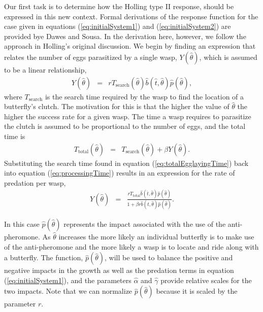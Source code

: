 \documentclass[12pt]{article}
\newcommand{\origB}{\hat{b}}
\newcommand{\origAlpha}{\hat{\alpha}}
\newcommand{\origGamma}{\hat{\gamma}}
\newcommand{\origP}[1]{\hat{p}(#1)}
\newcommand{\origTheta}{\hat{\theta}}
\newcommand{\origT}{\hat{t}}
\begin{document}
Our first task is to determine how the Holling type II response,
should be expressed in this new context. Formal derivations of the
response function for the case given in equations
(\ref{eq:initialSystem1}) and (\ref{eq:initialSystem2}) are provided
bye Dawes and Sousa\cite{DAWES201311}.  In the derivation here,
however, we follow the approach in Holling's original
discussion\cite{holling_1959A,holling_1959B}. We begin by finding an
expression that relates the number of eggs parasitized by a single
wasp, $Y(\origTheta)$, which is assumed to be a linear relationship,
\begin{eqnarray}
  \label{eq:processingTime}
  Y(\origTheta) & = & r T_{\mathrm{search}}(\origTheta) \origB(\origT,\origTheta) \origP{\origTheta},
\end{eqnarray}
where $T_{\mathrm{search}}$ is the search time required by the wasp to
find the location of a butterfly's clutch. The motivation for this is
that the higher the value of $\origTheta$ the higher the success rate for
a given wasp.  The time a wasp requires to parasitize the clutch is
assumed to be proportional to the number of eggs, and the total time
is
\begin{eqnarray}
  \label{eq:totalEgglayingTime}
  T_{\mathrm{total}}(\origTheta) & = & T_{\mathrm{search}}(\origTheta) + \beta Y(\origTheta).
\end{eqnarray}
Substituting the search time found in equation
(\ref{eq:totalEgglayingTime}) back into equation
(\ref{eq:processingTime}) results in an expression for the rate of
predation per wasp,
\begin{eqnarray}
  \label{eq:waspPredationRate}
  Y(\origTheta) & = & \frac{r T_{\mathrm{total}} \origB(\origT,\origTheta) \origP{\origTheta}}{1 + \beta r \origB(\origT,\origTheta) \origP{\origTheta}}.
\end{eqnarray}

In this case $\origP{\origTheta}$ represents the impact associated with the use
of the anti-pheromone. As $\origTheta$ increases the more likely an
individual butterfly is to make use of the anti-pheromone and the more
likely a wasp is to locate and ride along with a butterfly. The
function, $\origP{\origTheta}$, will be used to balance the positive and
negative impacts in the growth as well as the predation terms in
equation (\ref{eq:initialSystem1}), and the parameters $\origAlpha$ and
$\origGamma$ provide relative scales for the two impacts. Note that we can
normalize $\origP{\origTheta}$ because it is scaled by the parameter $r$.
\end{document}
